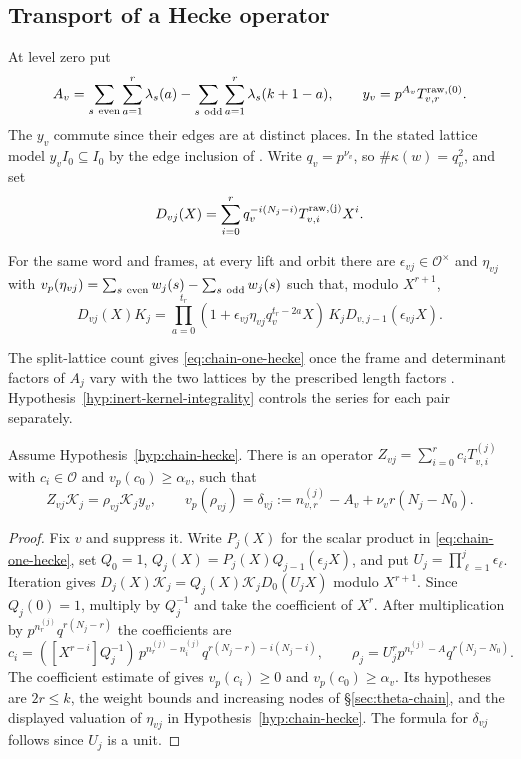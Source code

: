 \subsection{Transport of a Hecke operator}

At level zero put
\[
 A_v=\sum_{s\ {\rm even}}\sum_{a=1}^r\lambda_s(a)
        -\sum_{s\ {\rm odd}}\sum_{a=1}^r\lambda_s(k+1-a),
 \qquad y_v=p^{A_v}T^{\rm raw,(0)}_{v,r}.
\]
The $y_v$ commute since their edges are at distinct places. In the
stated lattice model $y_v I_0\subseteq I_0$ by the edge inclusion
of \citep[Lemmas~11.4 and~11.8]{adriazola-grh}.
Write $q_v=p^{\nu_v}$, so $\#\kappa(w)=q_v^2$, and set
\[
 D_{vj}(X)=\sum_{i=0}^r q_v^{-i(N_j-i)}T^{\rm raw,(j)}_{v,i}X^i .
\]

\begin{hypothesis}[\openinput]\label{hyp:chain-hecke}
For the same word and frames, at every lift and orbit there are
$\epsilon_{vj}\in\mathcal O^\times$ and $\eta_{vj}$ with
$v_p(\eta_{vj})=\sum_{s\ {\rm even}}w_j(s)-\sum_{s\ {\rm odd}}w_j(s)$
such that, modulo $X^{r+1}$,
\begin{equation}\label{eq:chain-one-hecke}
 D_{vj}(X)K_j =
 \prod_{a=0}^{t_r}(1+\epsilon_{vj}\eta_{vj}q_v^{t_r-2a}X)
 \,K_jD_{v,j-1}(\epsilon_{vj}X).
\end{equation}
\end{hypothesis}

The split-lattice count gives \eqref{eq:chain-one-hecke} once the
frame and determinant factors of $A_j$ vary with the two lattices by
the prescribed length factors \citep[Proposition~10.13 and
Hypothesis~11.22]{adriazola-grh}. Hypothesis~\ref{hyp:inert-kernel-integrality}
controls the series for each pair separately.

\begin{lemma}\label{lem:chain-hecke-price}
Assume Hypothesis~\ref{hyp:chain-hecke}. There is an operator
$Z_{vj}=\sum_{i=0}^r c_i T^{(j)}_{v,i}$ with $c_i\in\mathcal O$ and
$v_p(c_0)\ge\alpha_v$, such that
\[
 Z_{vj}\mathcal K_j=\rho_{vj}\mathcal K_j y_v,\qquad
 v_p(\rho_{vj})=\delta_{vj}
      :=n^{(j)}_{v,r}-A_v+\nu_v r(N_j-N_0).
\]
\end{lemma}

\begin{proof}
Fix $v$ and suppress it. Write $P_j(X)$ for the scalar product in
\eqref{eq:chain-one-hecke}, set $Q_0=1$,
$Q_j(X)=P_j(X)Q_{j-1}(\epsilon_jX)$, and put $U_j=\prod_{\ell=1}^j\epsilon_\ell$.
Iteration gives
$D_j(X)\mathcal K_j=Q_j(X)\mathcal K_jD_0(U_jX)$ modulo $X^{r+1}$.
Since $Q_j(0)=1$, multiply by $Q_j^{-1}$ and take the coefficient of $X^r$.
After multiplication by $p^{n^{(j)}_r}q^{r(N_j-r)}$ the coefficients are
\[
 c_i=([X^{r-i}]Q_j^{-1})\,p^{n^{(j)}_r-n^{(j)}_i}
              q^{r(N_j-r)-i(N_j-i)},\qquad
 \rho_j=U_j^r p^{n^{(j)}_r-A}q^{r(N_j-N_0)} .
\]
The coefficient estimate of \citep[Theorem~11.33]{adriazola-grh}
gives $v_p(c_i)\ge0$ and $v_p(c_0)\ge\alpha_v$. Its hypotheses are
$2r\le k$, the weight bounds and increasing nodes of \S\ref{sec:theta-chain},
and the displayed valuation of $\eta_{vj}$ in Hypothesis~\ref{hyp:chain-hecke}.
The formula for $\delta_{vj}$ follows since $U_j$ is a unit.
\end{proof}

